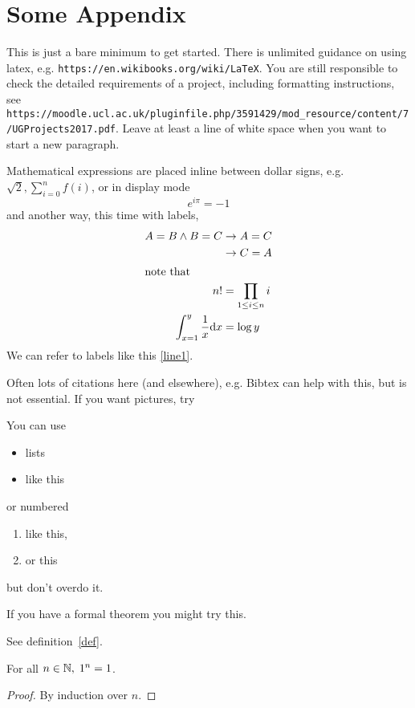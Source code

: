 \chapter{Some Appendix}
    This is just a bare minimum to get started.  There is unlimited guidance on using latex, e.g. {\tt https://en.wikibooks.org/wiki/LaTeX}.   You are still responsible to check the detailed requirements of a project, including formatting instructions, see \\
    {\tt https://moodle.ucl.ac.uk/pluginfile.php/3591429/mod\_resource/content/7/UGProjects2017.pdf}.
    Leave at least a line of white space when you want to start a new paragraph.
    
    Mathematical expressions are placed inline between dollar signs, e.g. $\sqrt 2, \sum_{i=0}^nf(i)$, or in display mode
    \[ e^{i\pi}=-1\] and another way, this time with labels,
    \begin{align}
    \label{line1} A=B\wedge B=C&\rightarrow A=C\\
    &\rightarrow C=A\\
    \intertext{note that}
    n!&=\prod_{1\leq i\leq n}i \\
    \int_{x=1}^y \frac 1 x \mathrm{d}x&=\log y
    \end{align}
    We can refer to labels like this \eqref{line1}.
    
    Often lots of citations here (and elsewhere), e.g. Bibtex can help with this, but is not essential. If you want pictures, try

    You can use 
    \begin{itemize}
    \item lists
    \item like this
    \end{itemize}
    or numbered
    \begin{enumerate}
    \item like this,
    \item or this
    \end{enumerate}
    but don't overdo it.
    
    If you have a formal theorem you might try this.
    \begin{definition}\label{def}
    See definition~\ref{def}.
    \end{definition}
    \begin{theorem}
    For all $n\in\mbox{\( \mathbb N \)},\; 1^n=1$.
    \end{theorem}
    \begin{proof}
    By induction over $n$.
    \end{proof}
